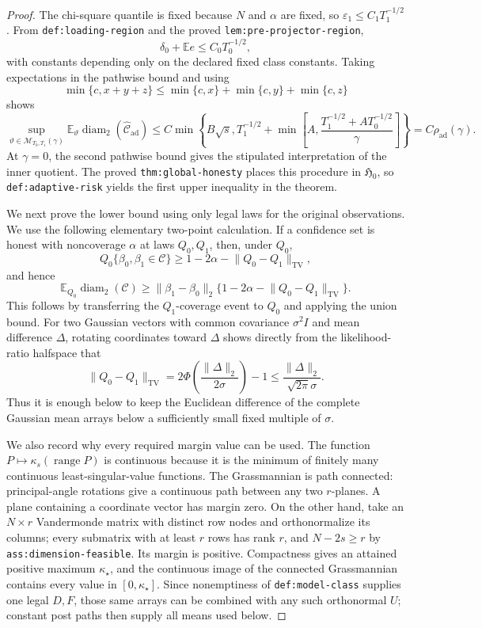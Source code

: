 \documentclass{article}
\begin{document}
\begin{proof}
The chi-square quantile is fixed because \(N\) and \(\alpha\) are fixed, so \(\varepsilon_1\le C_1T_1^{-1/2}\).  From \texttt{def:loading-region} and the proved \texttt{lem:pre-projector-region},
\[
 \delta_0+\mathbb Ee\le C_0T_0^{-1/2},
\]
with constants depending only on the declared fixed class constants.  Taking expectations in the pathwise bound and using
\[
 \min\{c,x+y+z\}\le\min\{c,x\}+\min\{c,y\}+\min\{c,z\}
\]
shows
\[
 \sup_{\vartheta\in\mathcal M_{T_0,T_1}(\gamma)}
 \mathbb E_\vartheta\operatorname{diam}_2(\widehat{\mathcal C}_{\mathrm{ad}})
 \le C\min\left\{B\sqrt s, T_1^{-1/2}+
 \min\left[A,\frac{T_1^{-1/2}+AT_0^{-1/2}}{\gamma}\right]\right\}
 =C\rho_{\mathrm{ad}}(\gamma).
\]
At \(\gamma=0\), the second pathwise bound gives the stipulated interpretation of the inner quotient.  The proved \texttt{thm:global-honesty} places this procedure in \(\mathfrak H_0\), so \texttt{def:adaptive-risk} yields the first upper inequality in the theorem.

We next prove the lower bound using only legal laws for the original observations.  We use the following elementary two-point calculation.  If a confidence set is honest with noncoverage \(\alpha\) at laws \(Q_0,Q_1\), then, under \(Q_0\),
\[
 Q_0\{\beta_0,\beta_1\in\mathcal C\}
 \ge1-2\alpha-\lVert Q_0-Q_1\rVert_{\mathrm{TV}},
\]
and hence
\[
 \mathbb E_{Q_0}\operatorname{diam}_2(\mathcal C)
 \ge\lVert\beta_1-\beta_0\rVert_2
 \{1-2\alpha-\lVert Q_0-Q_1\rVert_{\mathrm{TV}}\}.
\]
This follows by transferring the \(Q_1\)-coverage event to \(Q_0\) and applying the union bound.  For two Gaussian vectors with common covariance \(\sigma^2I\) and mean difference \(\Delta\), rotating coordinates toward \(\Delta\) shows directly from the likelihood-ratio halfspace that
\[
 \lVert Q_0-Q_1\rVert_{\mathrm{TV}}
 =2\Phi\left(\frac{\lVert\Delta\rVert_2}{2\sigma}\right)-1
 \le\frac{\lVert\Delta\rVert_2}{\sqrt{2\pi}\sigma}.
\]
Thus it is enough below to keep the Euclidean difference of the complete Gaussian mean arrays below a sufficiently small fixed multiple of \(\sigma\).

We also record why every required margin value can be used.  The function \(P\mapsto\kappa_s(\operatorname{range}P)\) is continuous because it is the minimum of finitely many continuous least-singular-value functions.  The Grassmannian is path connected: principal-angle rotations give a continuous path between any two \(r\)-planes.  A plane containing a coordinate vector has margin zero.  On the other hand, take an \(N\times r\) Vandermonde matrix with distinct row nodes and orthonormalize its columns; every submatrix with at least \(r\) rows has rank \(r\), and \(N-2s\ge r\) by \texttt{ass:dimension-feasible}.  Its margin is positive.  Compactness gives an attained positive maximum \(\kappa_\star\), and the continuous image of the connected Grassmannian contains every value in \([0,\kappa_\star]\).  Since nonemptiness of \texttt{def:model-class} supplies one legal \(D,F\), those same arrays can be combined with any such orthonormal \(U\); constant post paths then supply all means used below.


\end{proof}
\end{document}
